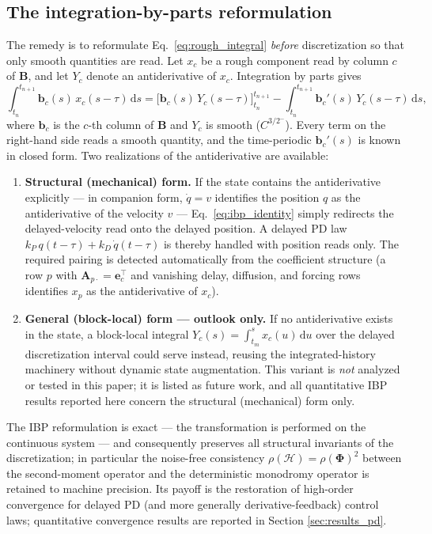 \documentclass[preprint,12pt]{elsarticle}
\begin{document}
\subsection{The integration-by-parts reformulation}
The remedy is to reformulate Eq.~\eqref{eq:rough_integral} \emph{before} discretization so that only smooth quantities are read. Let $x_c$ be a rough component read by column $c$ of $\mathbf{B}$, and let $Y_c$ denote an antiderivative of $x_c$. Integration by parts gives
\begin{equation}
\label{eq:ibp_identity}
\int_{t_n}^{t_{n+1}} \mathbf{b}_c(s)\, x_c(s-\tau)\, \mathrm{d}s
= \Big[ \mathbf{b}_c(s)\, Y_c(s-\tau) \Big]_{t_n}^{t_{n+1}}
- \int_{t_n}^{t_{n+1}} \mathbf{b}_c'(s)\, Y_c(s-\tau)\, \mathrm{d}s ,
\end{equation}
where $\mathbf{b}_c$ is the $c$-th column of $\mathbf{B}$ and $Y_c$ is smooth ($C^{3/2^-}$). Every term on the right-hand side reads a smooth quantity, and the time-periodic $\mathbf{b}_c'(s)$ is known in closed form. Two realizations of the antiderivative are available:
\begin{enumerate}
\item \textbf{Structural (mechanical) form.} If the state contains the antiderivative explicitly --- in companion form, $\dot q = v$ identifies the position $q$ as the antiderivative of the velocity $v$ --- Eq.~\eqref{eq:ibp_identity} simply redirects the delayed-velocity read onto the delayed position. A delayed PD law $k_P\, q(t-\tau) + k_D\, \dot q(t-\tau)$ is thereby handled with position reads only. The required pairing is detected automatically from the coefficient structure (a row $p$ with $\mathbf{A}_{p\cdot} = \mathbf{e}_c^\top$ and vanishing delay, diffusion, and forcing rows identifies $x_p$ as the antiderivative of $x_c$).
\item \textbf{General (block-local) form --- outlook only.} If no antiderivative exists in the state, a block-local integral $Y_c(s) = \int_{t_{m}}^{s} x_c(u)\,\mathrm{d}u$ over the delayed discretization interval could serve instead, reusing the integrated-history machinery without dynamic state augmentation. This variant is \emph{not} analyzed or tested in this paper; it is listed as future work, and all quantitative IBP results reported here concern the structural (mechanical) form only.
\end{enumerate}
The IBP reformulation is exact --- the transformation is performed on the continuous system --- and consequently preserves all structural invariants of the discretization; in particular the noise-free consistency $\rho(\mathcal{H}) = \rho(\mathbf{\Phi})^2$ between the second-moment operator and the deterministic monodromy operator is retained to machine precision. Its payoff is the restoration of high-order convergence for delayed PD (and more generally derivative-feedback) control laws; quantitative convergence results are reported in Section \ref{sec:results_pd}.
\end{document}
